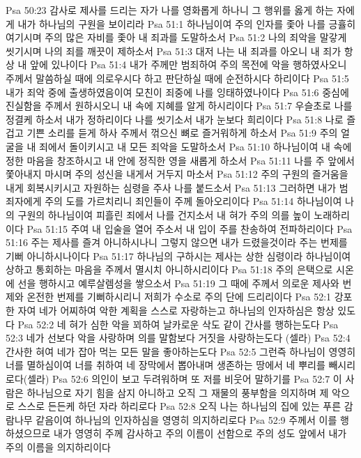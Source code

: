 Psa 50:23  감사로 제사를 드리는 자가 나를 영화롭게 하나니 그 행위를 옳게 하는 자에게 내가 하나님의 구원을 보이리라
Psa 51:1  하나님이여 주의 인자를 좇아 나를 긍휼히 여기시며 주의 많은 자비를 좇아 내 죄과를 도말하소서
Psa 51:2  나의 죄악을 말갛게 씻기시며 나의 죄를 깨끗이 제하소서
Psa 51:3  대저 나는 내 죄과를 아오니 내 죄가 항상 내 앞에 있나이다
Psa 51:4  내가 주께만 범죄하여 주의 목전에 악을 행하였사오니 주께서 말씀하실 때에 의로우시다 하고 판단하실 때에 순전하시다 하리이다
Psa 51:5  내가 죄악 중에 출생하였음이여 모친이 죄중에 나를 잉태하였나이다
Psa 51:6  중심에 진실함을 주께서 원하시오니 내 속에 지혜를 알게 하시리이다
Psa 51:7  우슬초로 나를 정결케 하소서 내가 정하리이다 나를 씻기소서 내가 눈보다 희리이다
Psa 51:8  나로 즐겁고 기쁜 소리를 듣게 하사 주께서 꺾으신 뼈로 즐거워하게 하소서
Psa 51:9  주의 얼굴을 내 죄에서 돌이키시고 내 모든 죄악을 도말하소서
Psa 51:10  하나님이여 내 속에 정한 마음을 창조하시고 내 안에 정직한 영을 새롭게 하소서
Psa 51:11  나를 주 앞에서 쫓아내지 마시며 주의 성신을 내게서 거두지 마소서
Psa 51:12  주의 구원의 즐거움을 내게 회복시키시고 자원하는 심령을 주사 나를 붙드소서
Psa 51:13  그러하면 내가 범죄자에게 주의 도를 가르치리니 죄인들이 주께 돌아오리이다
Psa 51:14  하나님이여 나의 구원의 하나님이여 피흘린 죄에서 나를 건지소서 내 혀가 주의 의를 높이 노래하리이다
Psa 51:15  주여 내 입술을 열어 주소서 내 입이 주를 찬송하여 전파하리이다
Psa 51:16  주는 제사를 즐겨 아니하시나니 그렇지 않으면 내가 드렸을것이라 주는 번제를 기뻐 아니하시나이다
Psa 51:17  하나님의 구하시는 제사는 상한 심령이라 하나님이여 상하고 통회하는 마음을 주께서 멸시치 아니하시리이다
Psa 51:18  주의 은택으로 시온에 선을 행하시고 예루살렘성을 쌓으소서
Psa 51:19  그 때에 주께서 의로운 제사와 번제와 온전한 번제를 기뻐하시리니 저희가 수소로 주의 단에 드리리이다
Psa 52:1  강포한 자여 네가 어찌하여 악한 계획을 스스로 자랑하는고 하나님의 인자하심은 항상 있도다
Psa 52:2  네 혀가 심한 악을 꾀하여 날카로운 삭도 같이 간사를 행하는도다
Psa 52:3  네가 선보다 악을 사랑하며 의를 말함보다 거짓을 사랑하는도다 (셀라)
Psa 52:4  간사한 혀여 네가 잡아 먹는 모든 말을 좋아하는도다
Psa 52:5  그런즉 하나님이 영영히 너를 멸하심이여 너를 취하여 네 장막에서 뽑아내며 생존하는 땅에서 네 뿌리를 빼시리로다(셀라)
Psa 52:6  의인이 보고 두려워하며 또 저를 비웃어 말하기를
Psa 52:7  이 사람은 하나님으로 자기 힘을 삼지 아니하고 오직 그 재물의 풍부함을 의지하며 제 악으로 스스로 든든케 하던 자라 하리로다
Psa 52:8  오직 나는 하나님의 집에 있는 푸른 감람나무 같음이여 하나님의 인자하심을 영영히 의지하리로다
Psa 52:9  주께서 이를 행하셨으므로 내가 영영히 주께 감사하고 주의 이름이 선함으로 주의 성도 앞에서 내가 주의 이름을 의지하리이다
